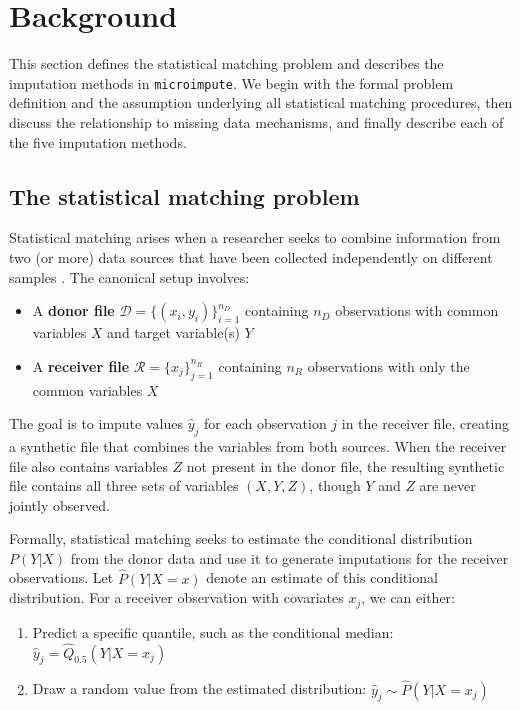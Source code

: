 \section{Background}\label{sec:background}

This section defines the statistical matching problem and describes the imputation methods in \texttt{microimpute}. We begin with the formal problem definition and the assumption underlying all statistical matching procedures, then discuss the relationship to missing data mechanisms, and finally describe each of the five imputation methods.

\subsection{The statistical matching problem}

Statistical matching arises when a researcher seeks to combine information from two (or more) data sources that have been collected independently on different samples \citep{dorazio2006statistical}. The canonical setup involves:

\begin{itemize}
    \item A \textbf{donor file} $\mathcal{D} = \{(x_i, y_i)\}_{i=1}^{n_D}$ containing $n_D$ observations with common variables $X$ and target variable(s) $Y$
    \item A \textbf{receiver file} $\mathcal{R} = \{x_j\}_{j=1}^{n_R}$ containing $n_R$ observations with only the common variables $X$
\end{itemize}

The goal is to impute values $\hat{y}_j$ for each observation $j$ in the receiver file, creating a synthetic file that combines the variables from both sources. When the receiver file also contains variables $Z$ not present in the donor file, the resulting synthetic file contains all three sets of variables $(X, Y, Z)$, though $Y$ and $Z$ are never jointly observed.

Formally, statistical matching seeks to estimate the conditional distribution $P(Y|X)$ from the donor data and use it to generate imputations for the receiver observations. Let $\hat{P}(Y|X=x)$ denote an estimate of this conditional distribution. For a receiver observation with covariates $x_j$, we can either:
\begin{enumerate}
    \item Predict a specific quantile, such as the conditional median: $\hat{y}_j = \hat{Q}_{0.5}(Y|X=x_j)$
    \item Draw a random value from the estimated distribution: $\hat{y}_j \sim \hat{P}(Y|X=x_j)$
\end{enumerate}

